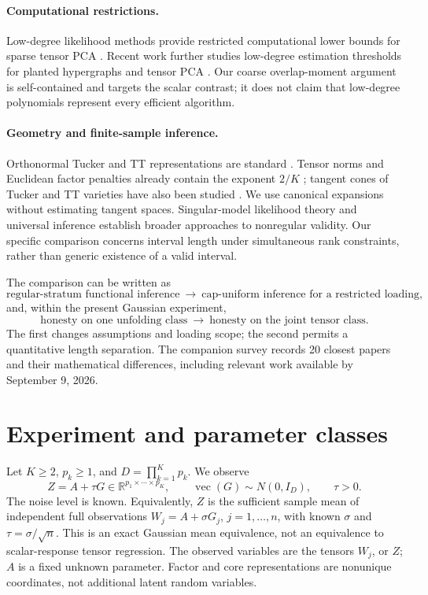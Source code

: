 \documentclass[11pt]{article}
\theoremstyle{remark}
\newcommand{\R}{\mathbb R}
\begin{document}
\paragraph{Computational restrictions.}
Low-degree likelihood methods provide restricted computational lower bounds for sparse tensor PCA \citep{choo2021}. Recent work further studies low-degree estimation thresholds for planted hypergraphs and tensor PCA \citep{fu2026}. Our coarse overlap-moment argument is self-contained and targets the scalar contrast; it does not claim that low-degree polynomials represent every efficient algorithm.

\paragraph{Geometry and finite-sample inference.}
Orthonormal Tucker and TT representations are standard \citep{delathauwer2000,oseledets2011}. Tensor norms and Euclidean factor penalties already contain the exponent $2/K$ \citep{friedlandlim2018,fan2023}; tangent cones of Tucker and TT varieties have also been studied \citep{gao2025,kutschan2018}. We use canonical expansions without estimating tangent spaces. Singular-model likelihood theory \citep{drton2009} and universal inference \citep{wasserman2020} establish broader approaches to nonregular validity. Our specific comparison concerns interval length under simultaneous rank constraints, rather than generic existence of a valid interval.

The comparison can be written as
\[
 \text{regular-stratum functional inference}
 \ \longrightarrow\ 
 \text{cap-uniform inference for a restricted loading},
\]
and, within the present Gaussian experiment,
\[
 \text{honesty on one unfolding class}
 \ \longrightarrow\
 \text{honesty on the joint tensor class}.
\]
The first changes assumptions and loading scope; the second permits a quantitative length separation. The companion survey records 20 closest papers and their mathematical differences, including relevant work available by September 9, 2026.

\section{Experiment and parameter classes}\label{sec:model}

Let $K\ge2$, $p_k\ge1$, and $D=\prod_{k=1}^K p_k$. We observe
\begin{equation}\label{eq:model}
 Z=A+\tau G\in\R^{p_1\times\cdots\times p_K},\qquad
 \operatorname{vec}(G)\sim N(0,I_D),\qquad \tau>0.
\end{equation}
The noise level is known. Equivalently, $Z$ is the sufficient sample mean of independent full observations $W_j=A+\sigma G_j$, $j=1,\ldots,n$, with known $\sigma$ and $\tau=\sigma/\sqrt n$. This is an exact Gaussian mean equivalence, not an equivalence to scalar-response tensor regression. The observed variables are the tensors $W_j$, or $Z$; $A$ is a fixed unknown parameter. Factor and core representations are nonunique coordinates, not additional latent random variables.
\end{document}
